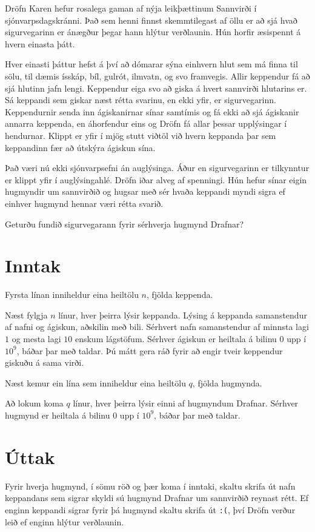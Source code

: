 
Dröfn Karen hefur rosalega gaman af nýja leikþættinum Sannvirði í sjónvarpsdagskránni.
Það sem henni finnst skemmtilegast af öllu er að sjá hvað sigurvegarinn er ánægður þegar hann hlýtur verðlaunin.
Hún horfir æsispennt á hvern einasta þátt.

Hver einasti þáttur hefst á því að dómarar sýna einhvern hlut sem má finna til sölu, til dæmis ísskáp, bíl, gulrót, ilmvatn, og svo framvegis.
Allir keppendur fá að sjá hlutinn jafn lengi.
Keppendur eiga svo að giska á hvert sannvirði hlutarins er.
Sá keppandi sem giskar næst rétta svarinu, en ekki yfir, er sigurvegarinn.
Keppendurnir senda inn ágiskanirnar sínar samtímis og fá ekki að sjá ágiskanir annarra keppenda,
en áhorfendur eins og Dröfn fá allar þessar upplýsingar í hendurnar.
Klippt er yfir í mjög stutt viðtöl við hvern keppanda þar sem keppandinn fær að útskýra ágiskun sína.

Það væri nú ekki sjónvarpsefni án auglýsinga.
Áður en sigurvegarinn er tilkynntur er klippt yfir í auglýsingahlé.
Dröfn iðar alveg af spenningi.
Hún hefur sínar eigin hugmyndir um sannvirðið og hugsar með sér hvaða keppandi myndi sigra ef einhver hugmynd hennar væri rétta svarið.

Geturðu fundið sigurvegarann fyrir sérhverja hugmynd Drafnar?


\section*{Inntak}
Fyrsta línan inniheldur eina heiltölu $n$, fjölda keppenda.

Næst fylgja $n$ línur, hver þeirra lýsir keppanda.
Lýsing á keppanda samanstendur af nafni og ágiskun, aðskilin með bili.
Sérhvert nafn samanstendur af minnsta lagi $1$ og mesta lagi $10$ enskum lágstöfum.
Sérhver ágiskun er heiltala á bilinu $0$ upp í $10^9$, báðar þar með taldar.
Þú mátt gera ráð fyrir að engir tveir keppendur giskuðu á sama virði.

Næst kemur ein lína sem inniheldur eina heiltölu $q$, fjölda hugmynda.

Að lokum koma $q$ línur, hver þeirra lýsir einni af hugmyndum Drafnar.
Sérhver hugmynd er heiltala á bilinu $0$ upp í $10^9$, báðar þar með taldar.

\section*{Úttak}
Fyrir hverja hugmynd, í sömu röð og þær koma í inntaki, skaltu skrifa út nafn keppandans sem sigrar skyldi sú hugmynd Drafnar um sannvirðið reynast rétt.
Ef enginn keppandi sigrar fyrir þá hugmynd skaltu skrifa út \texttt{:(}, því Dröfn verður leið ef enginn hlýtur verðlaunin.

